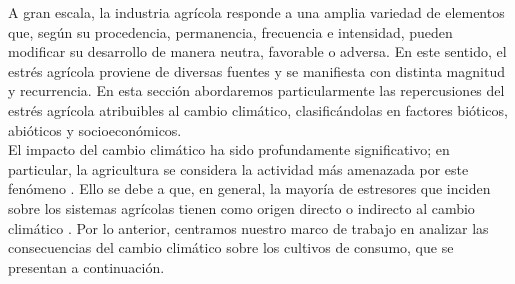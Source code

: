 A gran escala, la industria agrícola responde a una amplia variedad de elementos que, según su procedencia, permanencia, frecuencia e intensidad, pueden modificar su desarrollo de manera neutra, favorable o adversa. En este sentido, el estrés agrícola proviene de diversas fuentes y se manifiesta con distinta magnitud y recurrencia. En esta sección abordaremos particularmente las repercusiones del estrés agrícola atribuibles al cambio climático, clasificándolas en factores bióticos, abióticos y socioeconómicos.\\

El impacto del cambio climático ha sido profundamente significativo; en particular, la agricultura se considera la actividad más amenazada por este fenómeno \cite{Boyer_1982, Raza_2019}. Ello se debe a que, en general, la mayoría de estresores que inciden sobre los sistemas agrícolas tienen como origen directo o indirecto al cambio climático \cite{Olschewski_2024, Raza_2019, Surowka_2020}. Por lo anterior, centramos nuestro marco de trabajo en analizar las consecuencias del cambio climático sobre los cultivos de consumo, que se presentan a continuación.


